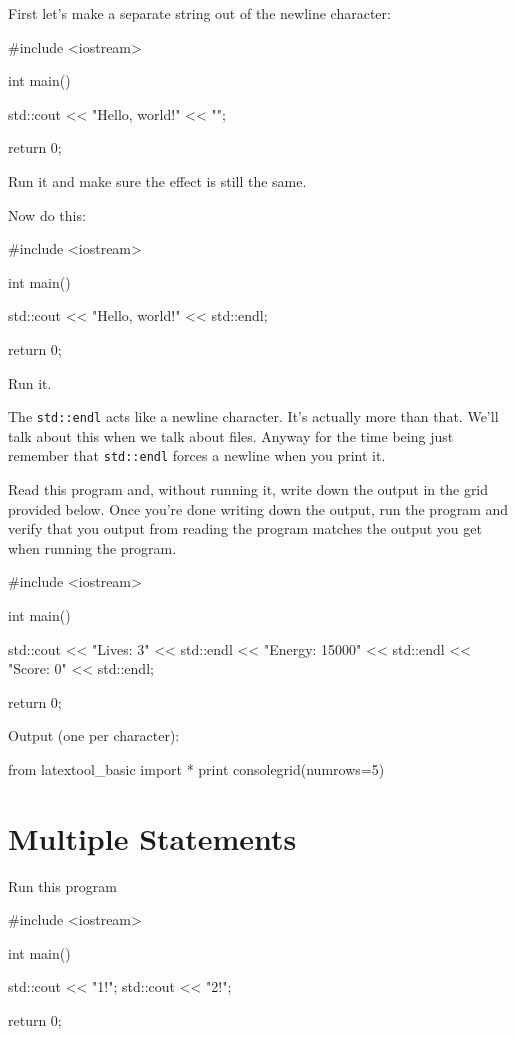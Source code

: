 First let's make a separate string out of the newline character:
\begin{console}
#include <iostream>

int main()
{
    std::cout << "Hello, world!" << "\n";

    return 0;
}
\end{console}
Run it and make sure the effect is still the same.

Now do this:
\begin{console}
#include <iostream>

int main()
{
    std::cout << "Hello, world!" << std::endl;

    return 0;
}
\end{console}
Run it.

The \verb!std::endl! acts like a newline character. 
It's actually more than that. 
We'll talk about this when we talk about files. 
Anyway for the time being just remember that 
\verb!std::endl! forces a newline when you print it.


\begin{ex}
Read this program and, without running it, write down the output in the 
grid provided below. Once you're done writing down the output, run the program and verify that you output from reading the program matches the output you get when running the program.
\begin{console}
#include <iostream>

int main()
{
    std::cout << "Lives: 3" << std::endl
              << "Energy: 15000" << std::endl
              << "Score: 0" << std::endl;

    return 0;
}
\end{console}
Output (one per character):
\begin{python}
from latextool_basic import *
print consolegrid(numrows=5)
\end{python}
\end{ex}








\newpage\section{Multiple Statements}

\begin{ex}
Run this program
\begin{console}
#include <iostream>

int main()
{
    std::cout << "1!\n";
    std::cout << "2!\n";

    return 0;
}
\end{console}
\end{ex}


